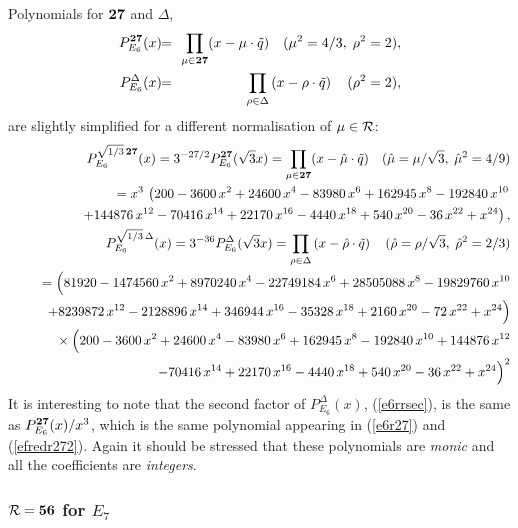 \documentclass[a4paper,12pt]{article}
\begin{document}
Polynomials for ${\bf 27}$ and $\Delta$,
\begin{eqnarray}
   P_{E_6}^{\bf 27}(x)&\!\!=\!\!&
   \prod_{\mu\in{\bf 27}}(x-\mu\cdot\tilde{q})\quad(\mu^2=4/3,\;\rho^2=2),
   \label{e6r27o}\\
%
   P_{E_6}^{\Delta}(x)&\!\!=\!\!&
   \prod_{\rho\in{\Delta}}\left(x-\rho\cdot\tilde{q}\right)\quad (\rho^2=2),
   \label{e6rrseco}
\end{eqnarray}
are slightly simplified for a different normalisation of $\mu\in{\cal R}$:
\begin{eqnarray}
   &&P_{E_6}^{\sqrt{1/3}\,{\bf 27}}(x)=3^{-27/2}P_{E_6}^{\bf 27}(\sqrt{3}x)=
   \prod_{\mu\in{\bf 27}}(x-\hat{\mu}\cdot\tilde{q})\quad
   (\hat{\mu}=\mu/\sqrt{3},\;\hat{\mu}^2=4/9)\nonumber\\
%
   &&=
   x^3\,\left( 200 - 3600\,x^2 + 24600\,x^4 - 83980\,x^6 +
   162945\,x^8 - 192840\,x^{10}  \right.\nonumber\\
   &&\quad\quad \left.  + 144876\,x^{12}-
   70416\,x^{14} + 22170\,x^{16} - 4440\,x^{18} +
   540\,x^{20} - 36\,x^{22} + x^{24} \right),
   \label{e6r27}\\
%
   &&P_{E_6}^{\sqrt{1/3}\,\Delta}(x)=3^{-36}P_{E_6}^{\Delta}(\sqrt{3}x)=
   \prod_{\rho\in{\Delta}}\left(x-\hat{\rho}\cdot\tilde{q}\right)\quad
   (\hat{\rho}=\rho/\sqrt{3},\;\hat{\rho}^2=2/3)\nonumber\\
%
   &&=\Bigl( 81920 - 1474560\,x^2 + 8970240\,x^4 - 22749184\,x^6 +
   28505088\,x^8 - 19829760\,x^{10} \nonumber\\
   &&\qquad + 8239872\,x^{12} - 2128896\,x^{14} +
   346944\,x^{16} - 35328\,x^{18} + 2160\,x^{20} - 72\,x^{22} + x^{24}
   \Bigr) \nonumber\\
   &&\phantom{=}\times \Bigl( 200 - 3600\,x^2 + 24600\,x^4 - 83980\,x^6 +
   162945\,x^8 - 192840\,x^{10} + 144876\,x^{12}\nonumber\\
   &&\qquad - 70416\,x^{14} +
   22170\,x^{16} - 4440\,x^{18} + 540\,x^{20} - 36\,x^{22} + x^{24} \Bigr)^2
   \label{e6rrsec}
\end{eqnarray}
It is interesting to note that the second factor of $P_{E_6}^{\Delta}(x)$,
(\ref{e6rrsec}), is the same as $P_{E_6}^{\bf 27}(x)/x^3$,
which is the same polynomial appearing in (\ref{e6r27}) and (\ref{efredr272}).
Again it should be stressed that these polynomials are {\em monic\/}
and all the coefficients are {\em integers\/}.

\subsubsection{${\cal R}={\bf 56}$ for $E_7$}
\end{document}

